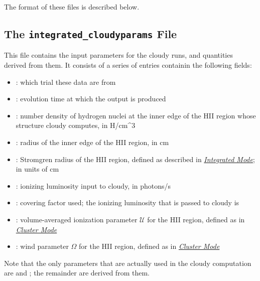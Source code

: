 \documentclass[letterpaper,10pt,english]{sphinxmanual}
\begin{document}
The format of these files is described below.


\subsection{The \texttt{integrated\_cloudyparams} File}
\label{cloudy:the-integrated-cloudyparams-file}
This file contains the input parameters for the cloudy runs, and
quantities derived from them. It consists of a series of entries
containin the following fields:
\begin{itemize}
\item {} 
: which trial these data are from

\item {} 
: evolution time at which the output is produced

\item {} 
: number density of hydrogen nuclei at the inner edge of the
HII region whose structure cloudy computes, in H/cm\textasciicircum{}3

\item {} 
: radius of the inner edge of the HII region, in cm

\item {} 
: Stromgren radius of the HII region, defined as described in
{\hyperref[cloudy:sssec\string-cloudy\string-integrated\string-mode]{\emph{Integrated Mode}}}; in units of cm

\item {} 
: ionizing luminosity input to cloudy, in photons/s

\item {} 
: covering factor used; the ionizing luminosity that is
passed to cloudy is 

\item {} 
: volume-averaged ionization parameter \(\mathcal{U}\) for
the HII region, defined as in {\hyperref[cloudy:sssec\string-cloudy\string-cluster\string-mode]{\emph{Cluster Mode}}}

\item {} 
: wind parameter \(\Omega\) for the HII region, defined
as in {\hyperref[cloudy:sssec\string-cloudy\string-cluster\string-mode]{\emph{Cluster Mode}}}

\end{itemize}

Note that the only parameters that are actually used in the cloudy
computation are  and ; the remainder are derived
from them.
\end{document}
